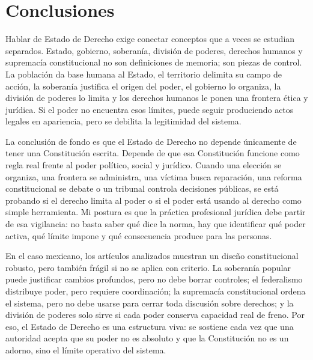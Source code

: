 \documentclass[
spanish,
letterpaper, oneside
]{article}
\begin{document}
	\section{Conclusiones}
	
	Hablar de Estado de Derecho exige conectar conceptos que a veces se estudian separados. Estado, gobierno, soberanía, división de poderes, derechos humanos y supremacía constitucional no son definiciones de memoria; son piezas de control. La población da base humana al Estado, el territorio delimita su campo de acción, la soberanía justifica el origen del poder, el gobierno lo organiza, la división de poderes lo limita y los derechos humanos le ponen una frontera ética y jurídica. Si el poder no encuentra esos límites, puede seguir produciendo actos legales en apariencia, pero se debilita la legitimidad del sistema.
	
	La conclusión de fondo es que el Estado de Derecho no depende únicamente de tener una Constitución escrita. Depende de que esa Constitución funcione como regla real frente al poder político, social y jurídico. Cuando una elección se organiza, una frontera se administra, una víctima busca reparación, una reforma constitucional se debate o un tribunal controla decisiones públicas, se está probando si el derecho limita al poder o si el poder está usando al derecho como simple herramienta. Mi postura es que la práctica profesional jurídica debe partir de esa vigilancia: no basta saber qué dice la norma, hay que identificar qué poder activa, qué límite impone y qué consecuencia produce para las personas.
	
	En el caso mexicano, los artículos analizados muestran un diseño constitucional robusto, pero también frágil si no se aplica con criterio. La soberanía popular puede justificar cambios profundos, pero no debe borrar controles; el federalismo distribuye poder, pero requiere coordinación; la supremacía constitucional ordena el sistema, pero no debe usarse para cerrar toda discusión sobre derechos; y la división de poderes solo sirve si cada poder conserva capacidad real de freno. Por eso, el Estado de Derecho es una estructura viva: se sostiene cada vez que una autoridad acepta que su poder no es absoluto y que la Constitución no es un adorno, sino el límite operativo del sistema.
	
	
	
\end{document}
